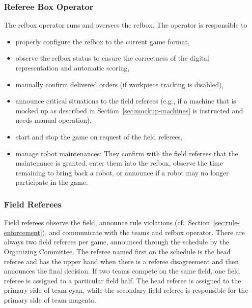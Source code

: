 \documentclass[12pt,twoside]{article}
\newcommand{\refsec}[1]{Section~\ref{#1}}
\begin{document}
\subsubsection{Referee Box Operator}
The \ac{refbox} operator runs and oversees the \ac{refbox}.
The operator is responsible to
\begin{itemize} \itemsep0em
  \item properly configure the \ac{refbox} to the current game format,
  \item observe the \ac{refbox} status to ensure the correctness of
    the digital representation and automatic scoring,
  \item manually confirm delivered orders (if workpiece tracking is disabled),
  \item announce critical situations to the field referees (e.g., if a machine
    that is mocked up as described in \refsec{sec:mockup-machines} is
    instructed and needs manual operation),
  \item start and stop the game on request of the field referees,
  \item manage robot maintenances:
    They confirm with the field referees that the maintenance is granted,
    enter them into the \ac{refbox},
    observe the time remaining to bring back a robot,
    or announce if a robot may no longer participate in the game.
\end{itemize}

\subsubsection{Field Referees}
Field referees observe the field, announce rule
violations (cf.~\refsec{sec:rule-enforcement}), and communicate with the teams
and \ac{refbox} operator.
There are always two field referees per game, announced through the schedule
by the Organizing Committee.
The referee named first on the schedule is the head referee and has the upper
hand when there is a referee disagreement and then announces
the final decision.
If two teams compete on the same field, one field referee is assigned to a
particular field half.
The head referee is assigned to the primary side of team cyan, while the
secondary field referee is responsible for the primary side of team magenta.
\end{document}
